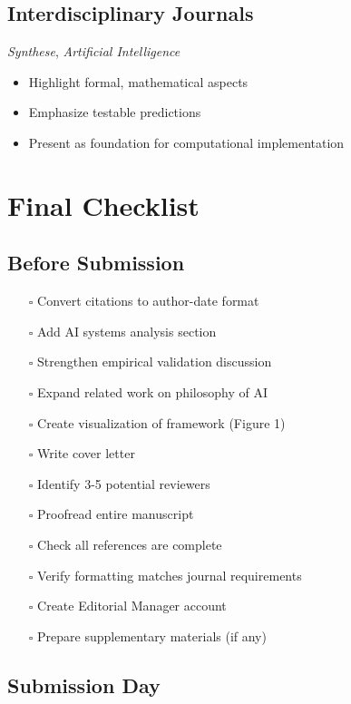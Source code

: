 \documentclass[12pt]{article}
\begin{document}
\subsection{Interdisciplinary Journals}

\textit{Synthese}, \textit{Artificial Intelligence}
\begin{itemize}
\item Highlight formal, mathematical aspects
\item Emphasize testable predictions
\item Present as foundation for computational implementation
\end{itemize}

\section{Final Checklist}

\subsection{Before Submission}

\begin{enumerate}[leftmargin=*]
\item[$\square$] Convert citations to author-date format
\item[$\square$] Add AI systems analysis section
\item[$\square$] Strengthen empirical validation discussion
\item[$\square$] Expand related work on philosophy of AI
\item[$\square$] Create visualization of framework (Figure 1)
\item[$\square$] Write cover letter
\item[$\square$] Identify 3-5 potential reviewers
\item[$\square$] Proofread entire manuscript
\item[$\square$] Check all references are complete
\item[$\square$] Verify formatting matches journal requirements
\item[$\square$] Create Editorial Manager account
\item[$\square$] Prepare supplementary materials (if any)
\end{enumerate}

\subsection{Submission Day}
\end{document}
